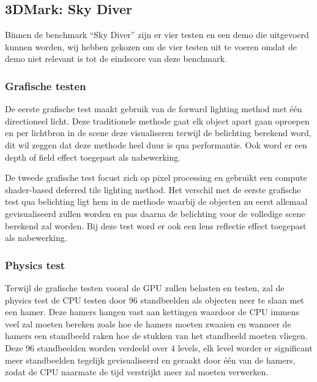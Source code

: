 \subsection{3DMark: Sky Diver}
Binnen de benchmark “Sky Diver” zijn er vier testen en een demo die uitgevoerd kunnen worden, wij hebben gekozen om de vier testen uit te voeren omdat de demo niet relevant is tot de eindscore van deze benchmark.

\subsubsection{Grafische testen}
De eerste grafische test maakt gebruik van de forward lighting method met één directioneel licht. Deze traditionele methode gaat elk object apart gaan oproepen en  per lichtbron in de scene deze visualiseren terwijl de belichting berekend word, dit wil zeggen dat deze methode heel duur is qua performantie. Ook word er een depth of field effect toegepast als nabewerking. \citep{3dmark_tech,3dmark_light}

De tweede grafische test focust zich op pixel processing en gebruikt een compute shader-based deferred tile lighting method. Het verschil met de eerste grafische test qua belichting ligt hem in de methode waarbij de objecten nu eerst allemaal gevisualiseerd zullen worden en pas daarna de belichting voor de volledige scene berekend zal worden. Bij deze test word er ook een lens reflectie effect toegepast als nabewerking. \citep{3dmark_tech,3dmark_light}


\subsubsection{Physics test} \label{sec-moa-phys}
Terwijl de grafische testen vooral de GPU zullen belasten en testen, zal de physics test de CPU testen door 96 standbeelden als objecten neer te slaan met een hamer. Deze hamers hangen vast aan kettingen waardoor de CPU immens veel zal moeten bereken zoals hoe de hamers moeten zwaaien en wanneer de hamers een standbeeld raken hoe de stukken van het standbeeld moeten vliegen. Deze 96 standbeelden worden verdeeld over 4 levels, elk level worder er significant meer standbeelden tegelijk gevisualiseerd en geraakt door één van de hamers, zodat de CPU naarmate de tijd verstrijkt meer zal moeten verwerken. \citep{3dmark_tech}

